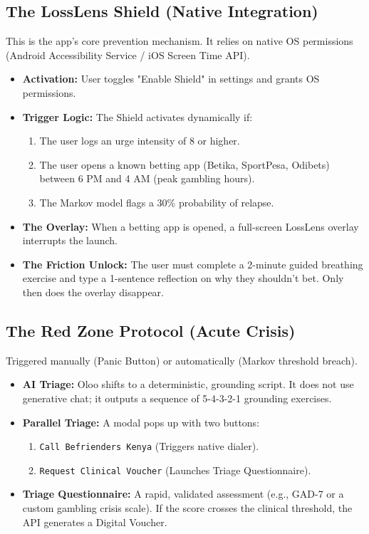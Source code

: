 \documentclass[11pt,a4paper]{article}
\begin{document}
\subsection{The LossLens Shield (Native Integration)}
This is the app's core prevention mechanism. It relies on native OS permissions (Android Accessibility Service / iOS Screen Time API).
\begin{itemize}
    \item \textbf{Activation:} User toggles "Enable Shield" in settings and grants OS permissions.
    \item \textbf{Trigger Logic:} The Shield activates dynamically if:
    \begin{enumerate}
        \item The user logs an urge intensity of 8 or higher.
        \item The user opens a known betting app (Betika, SportPesa, Odibets) between 6 PM and 4 AM (peak gambling hours).
        \item The Markov model flags a 30\% probability of relapse.
    \end{enumerate}
    \item \textbf{The Overlay:} When a betting app is opened, a full-screen LossLens overlay interrupts the launch.
    \item \textbf{The Friction Unlock:} The user must complete a 2-minute guided breathing exercise and type a 1-sentence reflection on why they shouldn't bet. Only then does the overlay disappear.
\end{itemize}

\subsection{The Red Zone Protocol (Acute Crisis)}
Triggered manually (Panic Button) or automatically (Markov threshold breach).
\begin{itemize}
    \item \textbf{AI Triage:} Oloo shifts to a deterministic, grounding script. It does not use generative chat; it outputs a sequence of 5-4-3-2-1 grounding exercises.
    \item \textbf{Parallel Triage:} A modal pops up with two buttons:
    \begin{enumerate}
        \item \texttt{Call Befrienders Kenya} (Triggers native dialer).
        \item \texttt{Request Clinical Voucher} (Launches Triage Questionnaire).
    \end{enumerate}
    \item \textbf{Triage Questionnaire:} A rapid, validated assessment (e.g., GAD-7 or a custom gambling crisis scale). If the score crosses the clinical threshold, the API generates a Digital Voucher.
\end{itemize}
\end{document}
